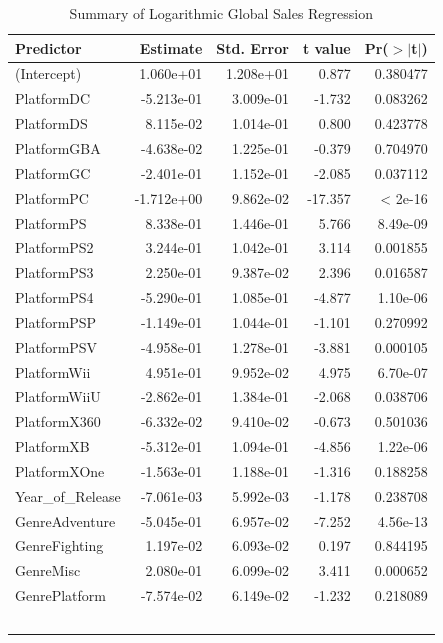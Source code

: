 \documentclass[12pt]{article}
\begin{document}
\begin{table}[ht]
  \caption{Summary of Logarithmic Global Sales Regression}
  \label{tab:logglobal}
  \centering
  \begin{tabular}{lrrrr}
    \hline
    Predictor & Estimate & Std. Error & t value & Pr($>$$|$t$|$) \\
    \hline
    (Intercept) & 1.060e+01 & 1.208e+01 & 0.877 & 0.380477 \\
    PlatformDC & -5.213e-01 & 3.009e-01 & -1.732 & 0.083262 \\
    PlatformDS & 8.115e-02 & 1.014e-01 & 0.800 & 0.423778 \\
    PlatformGBA & -4.638e-02 & 1.225e-01 & -0.379 & 0.704970 \\
    PlatformGC & -2.401e-01 & 1.152e-01 & -2.085 & 0.037112 \\
    PlatformPC & -1.712e+00 & 9.862e-02 & -17.357 & < 2e-16 \\
    PlatformPS & 8.338e-01 & 1.446e-01 & 5.766 & 8.49e-09 \\
    PlatformPS2 & 3.244e-01 & 1.042e-01 & 3.114 & 0.001855 \\
    PlatformPS3 & 2.250e-01 & 9.387e-02 & 2.396 & 0.016587 \\
    PlatformPS4 & -5.290e-01 & 1.085e-01 & -4.877 & 1.10e-06 \\
    PlatformPSP & -1.149e-01 & 1.044e-01 & -1.101 & 0.270992 \\
    PlatformPSV & -4.958e-01 & 1.278e-01 & -3.881 & 0.000105 \\
    PlatformWii & 4.951e-01 & 9.952e-02 & 4.975 & 6.70e-07 \\
    PlatformWiiU & -2.862e-01 & 1.384e-01 & -2.068 & 0.038706 \\
    PlatformX360 & -6.332e-02 & 9.410e-02 & -0.673 & 0.501036 \\
    PlatformXB & -5.312e-01 & 1.094e-01 & -4.856 & 1.22e-06 \\
    PlatformXOne & -1.563e-01 & 1.188e-01 & -1.316 & 0.188258 \\
    Year\_of\_Release & -7.061e-03 & 5.992e-03 & -1.178 & 0.238708 \\
    GenreAdventure & -5.045e-01 & 6.957e-02 & -7.252 & 4.56e-13 \\
    GenreFighting & 1.197e-02 & 6.093e-02 & 0.197 & 0.844195 \\
    GenreMisc & 2.080e-01 & 6.099e-02 & 3.411 & 0.000652 \\
    GenrePlatform & -7.574e-02 & 6.149e-02 & -1.232 & 0.218089 \\
$$
\end{tabular}
\end{table}
\end{document}
